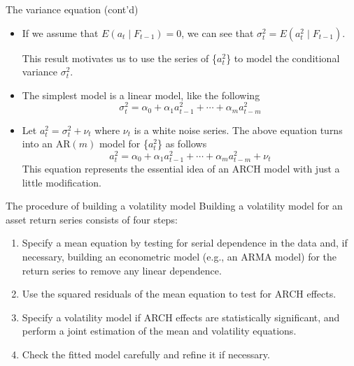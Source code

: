 \documentclass[presentation,10pt]{beamer}
\begin{document}
\begin{frame}[label={sec:org848f184}]{The variance equation (cont'd)}
\begin{itemize}
\item If we assume that \(E(a_t \mid F_{t-1}) = 0\), we can see that
\(\sigma^2_t = E(a^2_t \mid F_{t-1})\). 

\vspace{0.3cm}

This result motivates us to use
the series of \{\(a^2_t\)\} to model the conditional variance
\(\sigma^2_t\).

\item The simplest model is a linear model, like the following
\[ \sigma^2_t = \alpha_0 + \alpha_1 a^2_{t-1} + \cdots + \alpha_m a^2_{t-m} \]

\item Let \(a^2_t = \sigma^2_t + \nu_t\) where \(\nu_t\) is a white noise
series. The above equation turns into an AR\((m)\) model for \{\(a^2_t\)\}
as follows
\[a^2_t = \alpha_0 + \alpha_1 a^2_{t-1} + \cdots + \alpha_m
  a^2_{t-m} + \nu_t \]
This equation represents the essential idea of an ARCH model with just
a little modification.
\end{itemize}
\end{frame}

\begin{frame}[label={sec:org25d6ea2}]{The procedure of building a volatility model}
Building a volatility model for an asset return series consists of
four steps:

\begin{enumerate}
\item Specify a mean equation by testing for serial dependence in the
data and, if necessary, building an econometric model (e.g., an
ARMA model) for the return series to remove any linear dependence.

\item Use the squared residuals of the mean equation to test for ARCH
effects.

\item Specify a volatility model if ARCH effects are statistically
significant, and perform a joint estimation of the mean and
volatility equations.

\item Check the fitted model carefully and refine it if necessary.
\end{enumerate}
\end{frame}
\end{document}
